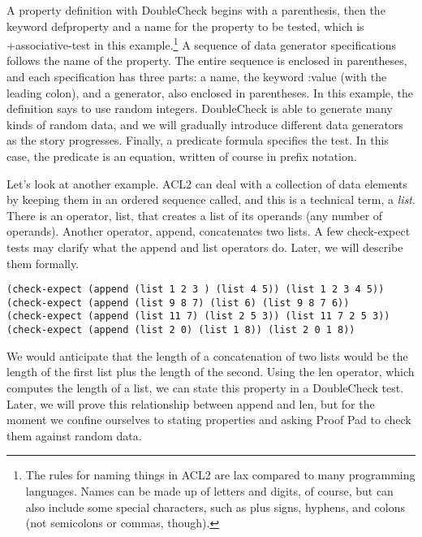 A property definition with
DoubleCheck begins with a parenthesis, then the keyword
\textsf{defproperty}
and a name for the property to be tested,
which is \textsf{+associative-test} in this example.\footnote{The
rules for naming things in ACL2 are lax compared to many
programming languages. Names can be made up of letters and digits, of course,
but can also include some special characters,
such as plus signs, hyphens, and colons (not semicolons or commas, though).}
A sequence of data generator specifications follows the name of the property.
The entire sequence is enclosed in parentheses,
and each specification has three parts: a name,
the keyword \textsf{:value} (with the leading colon),
and a generator, also enclosed in parentheses.
In this example, the definition says to use random integers.
DoubleCheck is able to generate many kinds of random data,
and we will gradually introduce different data generators as the story progresses.
Finally, a predicate formula specifies the test.
In this case, the predicate is an equation,
written of course in prefix notation.

Let's look at another example.
ACL2 can deal with a collection of data elements
by keeping them in an ordered sequence
called, and this is a technical term, a
\emph{list}.
There is an operator,
\label{list-op-informal}\textsf{list},
that creates a list of its operands
(any number of operands).
Another operator,
\label{append-op-informal}\textsf{append},
concatenates two lists.
A few \textsf{check-expect} tests may clarify
what the \textsf{append} and \textsf{list} operators do.
Later, we will describe them formally.

\begin{code}
\begin{verbatim}
(check-expect (append (list 1 2 3 ) (list 4 5)) (list 1 2 3 4 5))
(check-expect (append (list 9 8 7) (list 6) (list 9 8 7 6))
(check-expect (append (list 11 7) (list 2 5 3)) (list 11 7 2 5 3))
(check-expect (append (list 2 0) (list 1 8)) (list 2 0 1 8))
\end{verbatim}	
\end{code}

We would anticipate that the length of a concatenation of two lists
would be the length of the first list plus the length of the second.
Using the
\label{len-op-informal}\textsf{len}
operator, which computes the length of a list,
we can state this property in a DoubleCheck test.
Later, we will prove this relationship between \textsf{append} and \textsf{len},
but for the moment we confine ourselves to stating properties
and asking Proof Pad to check them against random data.

